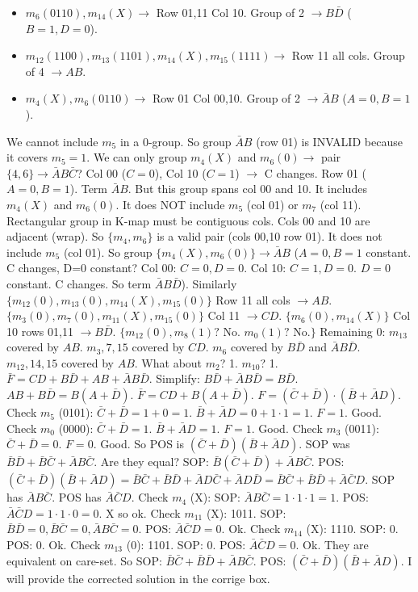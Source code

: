 \documentclass[11pt]{article}
\begin{document}
\begin{corrige}[Exercise 1]
\begin{itemize}
   \item $m_6(0110), m_{14}(X) \to$ Row 01,11 Col 10. Group of 2 $\to B\bar{D}$ ($B=1, D=0$).
   \item $m_{12}(1100), m_{13}(1101), m_{14}(X), m_{15}(1111) \to$ Row 11 all cols. Group of 4 $\to AB$.
   \item $m_4(X), m_6(0110) \to$ Row 01 Col 00,10. Group of 2 $\to \bar{A}B$ ($A=0,B=1$).
   \end{itemize}
   We cannot include $m_5$ in a 0-group. So group $\bar{A}B$ (row 01) is INVALID because it covers $m_5=1$.
   We can only group $m_4(X)$ and $m_6(0) \to$ pair $\{4,6\} \to \bar{A}B\bar{C}$? Col 00 ($C=0$), Col 10 ($C=1$) $\to$ C changes. Row 01 ($A=0,B=1$). Term $\bar{A}B$. But this group spans col 00 and 10. It includes $m_4(X)$ and $m_6(0)$. It does NOT include $m_5$ (col 01) or $m_7$ (col 11). Rectangular group in K-map must be contiguous cols. Cols 00 and 10 are adjacent (wrap). So $\{m_4, m_6\}$ is a valid pair (cols 00,10 row 01). It does not include $m_5$ (col 01).
   So group $\{m_4(X), m_6(0)\} \to \bar{A}B$ ($A=0,B=1$ constant. C changes, D=0 constant? Col 00: $C=0,D=0$. Col 10: $C=1,D=0$. $D=0$ constant. C changes. So term $\bar{A}B\bar{D}$).
   Similarly $\{m_{12}(0), m_{13}(0), m_{14}(X), m_{15}(0)\}$ Row 11 all cols $\to AB$.
   $\{m_3(0), m_7(0), m_{11}(X), m_{15}(0)\}$ Col 11 $\to CD$.
   $\{m_6(0), m_{14}(X)\}$ Col 10 rows 01,11 $\to B\bar{D}$.
   $\{m_{12}(0), m_8(1)?$ No. $m_0(1)?$ No.$\}$
   Remaining 0: $m_{13}$ covered by $AB$. $m_3,7,15$ covered by $CD$. $m_6$ covered by $B\bar{D}$ and $\bar{A}B\bar{D}$. $m_{12},14,15$ covered by $AB$.
   What about $m_2$? 1. $m_{10}$? 1.
   $\bar{F} = CD + B\bar{D} + AB + \bar{A}B\bar{D}$.
   Simplify: $B\bar{D} + \bar{A}B\bar{D} = B\bar{D}$. $AB + B\bar{D} = B(A+\bar{D})$.
   $\bar{F} = CD + B(A+\bar{D})$.
   $F = (\bar{C}+\bar{D}) \cdot (\bar{B} + \bar{A}D)$.
   Check $m_5$ (0101): $\bar{C}+\bar{D} = 1+0=1$. $\bar{B}+\bar{A}D = 0 + 1\cdot1 = 1$. $F=1$. Good.
   Check $m_0$ (0000): $\bar{C}+\bar{D}=1$. $\bar{B}+\bar{A}D=1$. $F=1$. Good.
   Check $m_3$ (0011): $\bar{C}+\bar{D}=0$. $F=0$. Good.
   So POS is $(\bar{C}+\bar{D})(\bar{B}+\bar{A}D)$.
   SOP was $\bar{B}\bar{D} + \bar{B}\bar{C} + \bar{A}B\bar{C}$.
   Are they equal?
   SOP: $\bar{B}(\bar{C}+\bar{D}) + \bar{A}B\bar{C}$.
   POS: $(\bar{C}+\bar{D})(\bar{B}+\bar{A}D) = \bar{B}\bar{C}+\bar{B}\bar{D} + \bar{A}D\bar{C} + \bar{A}D\bar{D} = \bar{B}\bar{C}+\bar{B}\bar{D} + \bar{A}\bar{C}D$.
   SOP has $\bar{A}B\bar{C}$. POS has $\bar{A}\bar{C}D$.
   Check $m_4$ (X): SOP: $\bar{A}B\bar{C} = 1\cdot1\cdot1=1$. POS: $\bar{A}\bar{C}D = 1\cdot1\cdot0=0$. X so ok.
   Check $m_{11}$ (X): 1011. SOP: $\bar{B}\bar{D}=0, \bar{B}\bar{C}=0, \bar{A}B\bar{C}=0$. POS: $\bar{A}\bar{C}D=0$. Ok.
   Check $m_{14}$ (X): 1110. SOP: 0. POS: 0. Ok.
   Check $m_{13}$ (0): 1101. SOP: 0. POS: $\bar{A}\bar{C}D=0$. Ok.
   They are equivalent on care-set.
   So SOP: $\bar{B}\bar{C} + \bar{B}\bar{D} + \bar{A}B\bar{C}$.
   POS: $(\bar{C}+\bar{D})(\bar{B}+\bar{A}D)$.
   I will provide the corrected solution in the corrige box.
\end{corrige}
\end{document}
